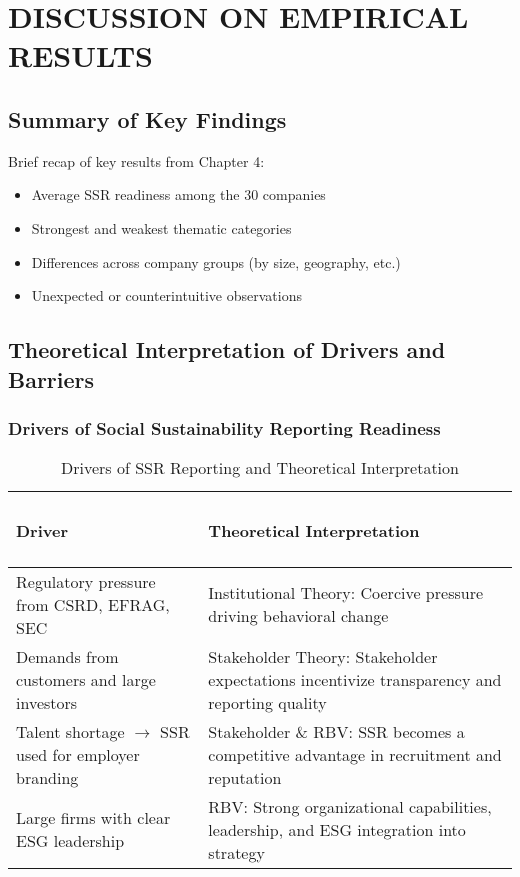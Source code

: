 \chapter{DISCUSSION ON EMPIRICAL RESULTS}

\section{Summary of Key Findings}
Brief recap of key results from Chapter 4:
\begin{itemize}
    \item Average SSR readiness among the 30 companies
    \item Strongest and weakest thematic categories
    \item Differences across company groups (by size, geography, etc.)
    \item Unexpected or counterintuitive observations
\end{itemize}

\section{Theoretical Interpretation of Drivers and Barriers}
\subsection{Drivers of Social Sustainability Reporting Readiness}

\begin{table}[H]
    \centering
    \caption{Drivers of SSR Reporting and Theoretical Interpretation}
    \begin{tabular}{p{6cm}|p{8cm}}
        \subsubsection{Driver} & \subsubsection{Theoretical Interpretation} \\
        \hline
        Regulatory pressure from CSRD, EFRAG, SEC & Institutional Theory: Coercive pressure driving behavioral change \\
        \hline
        Demands from customers and large investors & Stakeholder Theory: Stakeholder expectations incentivize transparency and reporting quality \\
        \hline
        Talent shortage $\rightarrow$ SSR used for employer branding & Stakeholder \& RBV: SSR becomes a competitive advantage in recruitment and reputation \\
        \hline
        Large firms with clear ESG leadership & RBV: Strong organizational capabilities, leadership, and ESG integration into strategy    \end{tabular}
\end{table}

